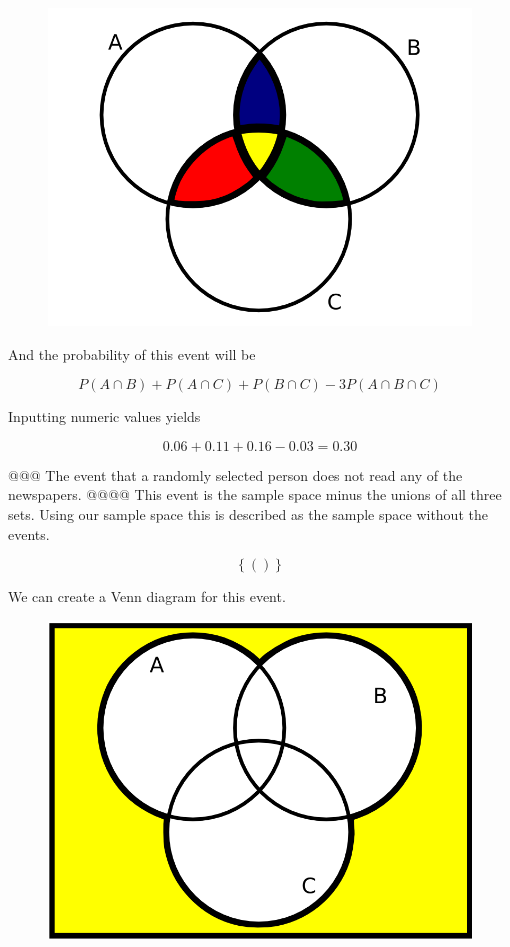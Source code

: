 \documentclass[10pt]{article}
\begin{document}
\begin{easylist}[enumerate]
        \begin{figure}[!ht]
            \centering
            \includegraphics[scale=0.25]{./img/venn2.png}
        \end{figure}

        And the probability of this event will be

        \[ P(A \cap B) + P(A \cap C) + P(B \cap C) - 3 P(A \cap B \cap C) \]

        Inputting numeric values yields

        \[ 0.06 + 0.11 + 0.16 - 0.03 = \boxed{0.30} \]

    @@@ The event that a randomly selected person does not read any of the newspapers.
    @@@@ This event is the sample space minus the unions of all three sets. Using our sample space this is described as the sample space without the events.

        \[ \left\{ () \right\} \]

        We can create a Venn diagram for this event.

        \begin{figure}[!ht]
            \centering
            \includegraphics[scale=0.25]{./img/venn3.png}
        \end{figure}


\end{easylist}
\end{document}
